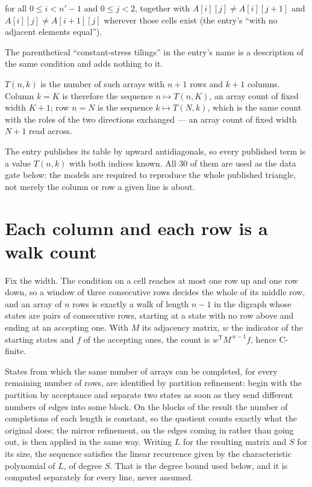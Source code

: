 \documentclass[11pt]{article}
\theoremstyle{definition}
\begin{document}
for all $0 \le i < n'-1$ and $0 \le j < 2$, together with $A[i][j] \ne A[i][j{+}1]$ and $A[i][j] \ne A[i{+}1][j]$ wherever those cells exist (the entry's ``with no adjacent elements equal'').

The parenthetical ``constant-stress tilings'' in the entry's name is a description of the same condition and adds nothing to it.

$T(n,k)$ is the number of such arrays with $n + 1$ rows and $k + 1$ columns. Column $k = K$ is therefore the sequence $n \mapsto T(n,K)$, an array count of fixed width $K + 1$; row $n = N$ is the sequence $k \mapsto T(N,k)$, which is the same count with the roles of the two directions exchanged --- an array count of fixed width $N + 1$ read across.

The entry publishes its table by upward antidiagonals, so every published term is a value $T(n,k)$ with both indices known. All 30 of them are used as the data gate below: the models are required to reproduce the whole published triangle, not merely the column or row a given line is about.

\section{Each column and each row is a walk count}

Fix the width. The condition on a cell reaches at most one row up and one row down, so a window of three consecutive rows decides the whole of its middle row, and an array of $n$ rows is exactly a walk of length $n-1$ in the digraph whose states are pairs of consecutive rows, starting at a state with no row above and ending at an accepting one. With $M$ its adjacency matrix, $w$ the indicator of the starting states and $f$ of the accepting ones, the count is $w^{\mathsf T}M^{\,n-1}f$, hence C-finite.

States from which the same number of arrays can be completed, for every remaining number of rows, are identified by partition refinement: begin with the partition by acceptance and separate two states as soon as they send different numbers of edges into some block. On the blocks of the result the number of completions of each length is constant, so the quotient counts exactly what the original does; the mirror refinement, on the edges coming in rather than going out, is then applied in the same way. Writing $L$ for the resulting matrix and $S$ for its size, the sequence satisfies the linear recurrence given by the characteristic polynomial of $L$, of degree $S$. That is the degree bound used below, and it is computed separately for every line, never assumed.
\end{document}
